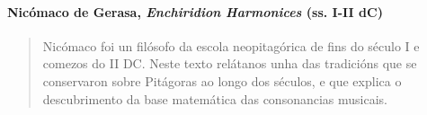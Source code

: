 

\paragraph{\texorpdfstring{Nicómaco de Gerasa, \emph{Enchiridion
Harmonices} (ss. I-II
dC)}{Nicómaco de Gerasa, Enchiridion Harmonices (ss. I-II dC)}}\label{nicuxf3maco-de-gerasa--enchiridion-harmonices--ss.-i-ii-dc}

 \begin{quote}
  Nicómaco foi un filósofo da escola neopitagórica de fins do século I e comezos do II DC. Neste texto relátanos unha das tradicións que se conservaron sobre Pitágoras ao longo dos séculos, e que explica o descubrimento da base matemática das consonancias musicais.
 \end{quote}
 

